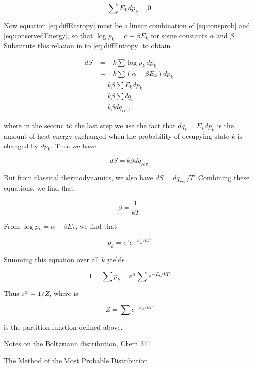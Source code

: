 \begin{equation}
\label{eq:dffConservedEnergy}
 \sum E_k\, d p_k = 0
\end{equation}

Now  equation \eqref{eq:diffEntropy} must be a linear combination of \eqref{eq:consprob}
and \eqref{eq:conservedEnergy}, so that $\log p_k = \alpha - \beta E_k$
for some constants $\alpha$ and $\beta$.  Substitute this relation in to \eqref{eq:diffEntropy} to obtain

\begin{align}
 dS & = -k \sum \log p_k\,  dp_k \\
      & = -k \sum (\alpha - \beta E_k) dp_k \\
      & = k\beta \sum E_k dp_k \\
     & = k\beta \sum dq_i \\
    & = k\beta dq_{rev},
\end{align}

where in the second to the last step we use the fact that $dq_k = E_k dp_k$  is the  amount of heat energy exchanged when the
probability of occupying state $k$ is changed by $dp_k$.  Thus we have

$$
dS = k\beta dq_{rev}
$$


But from classical thermodynamics, we also have $dS = dq_{rev}/T$.  Combining these equations, we find that

\begin{equation}
\beta = \frac{1}{kT}
\end{equation}

From $\log p_k = \alpha - \beta E_k$, we find that

\begin{equation}
p_k = e^\alpha e^{-E_k/kT}
\end{equation}

Summing this equation over all $k$ yields

\begin{equation}
1 = \sum p_k = e^\alpha \sum e^{-E_k/kT}
\end{equation}

Thus $e^\alpha = 1/Z$, where is

\begin{equation}
Z = \sum e^{-E_k/kT}
\end{equation}

is the partition function defined above.



\href{http://casegroup.rutgers.edu/lnotes/ccb341/boltzmann.pdf}{Notes on the Boltzmann distribution, Chem 341}

\href{http://www.physics.udel.edu/~glyde/PHYS813/Lectures/chapter_3.pdf}{The Method of the Most Probable Distribution}
